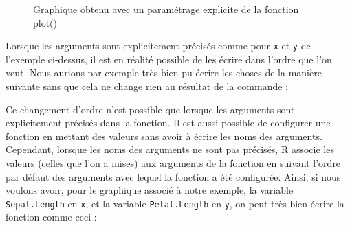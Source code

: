 \documentclass[
  letterpaper,
]{book}
\newenvironment{Shaded}{\begin{snugshade}}{\end{snugshade}}
\newcommand{\AttributeTok}[1]{\textcolor[rgb]{0.40,0.45,0.13}{#1}}
\newcommand{\FunctionTok}[1]{\textcolor[rgb]{0.28,0.35,0.67}{#1}}
\newcommand{\NormalTok}[1]{\textcolor[rgb]{0.00,0.23,0.31}{#1}}
\newcommand{\SpecialCharTok}[1]{\textcolor[rgb]{0.37,0.37,0.37}{#1}}
\begin{document}
\begin{figure}[H]


\caption{\label{fig-plot_function2}Graphique obtenu avec un paramétrage
explicite de la fonction plot()}

\end{figure}%

Lorsque les arguments sont explicitement précisés comme pour \texttt{x}
et \texttt{y} de l'exemple ci-dessus, il est en réalité possible de les
écrire dans l'ordre que l'on veut. Nous aurions par exemple très bien pu
écrire les choses de la manière suivante sans que cela ne change rien au
résultat de la commande :

\begin{Shaded}
\end{Shaded}

Ce changement d'ordre n'est possible que lorsque les arguments sont
explicitement précisés dans la fonction. Il est aussi possible de
configurer une fonction en mettant des valeurs sans avoir à écrire les
noms des arguments. Cependant, lorsque les noms des arguments ne sont
pas précisés, R associe les valeurs (celles que l'on a mises) aux
arguments de la fonction en suivant l'ordre par défaut des arguments
avec lequel la fonction a été configurée. Ainsi, si nous voulons avoir,
pour le graphique associé à notre exemple, la variable
\texttt{Sepal.Length} en \texttt{x}, et la variable
\texttt{Petal.Length} en \texttt{y}, on peut très bien écrire la
fonction comme ceci :
\end{document}
